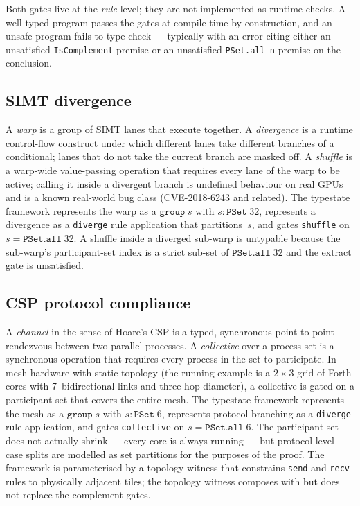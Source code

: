 \documentclass[acmsmall,screen,review,anonymous,nonacm]{acmart}
\newcommand{\PSet}{\texttt{PSet}}
\newcommand{\IsComplement}{\texttt{IsComplement}}
\begin{document}
Both gates live at the \emph{rule} level; they are not implemented as runtime checks. A well-typed program passes the gates at compile time by construction, and an unsafe program fails to type-check --- typically with an error citing either an unsatisfied \IsComplement{} premise or an unsatisfied \texttt{PSet.all n} premise on the conclusion.

\subsection{SIMT divergence}\label{sec:simt-divergence}

A \emph{warp} is a group of SIMT lanes that execute together. A \emph{divergence} is a runtime control-flow construct under which different lanes take different branches of a conditional; lanes that do not take the current branch are masked off. A \emph{shuffle} is a warp-wide value-passing operation that requires every lane of the warp to be active; calling it inside a divergent branch is undefined behaviour on real GPUs and is a known real-world bug class (CVE-2018-6243 and related). The typestate framework represents the warp as a $\texttt{group}\;s$ with $s : \PSet\;32$, represents a divergence as a \texttt{diverge} rule application that partitions~$s$, and gates \texttt{shuffle} on $s = \texttt{PSet.all}\;32$. A shuffle inside a diverged sub-warp is untypable because the sub-warp's participant-set index is a strict sub-set of $\texttt{PSet.all}\;32$ and the extract gate is unsatisfied.

\subsection{CSP protocol compliance}\label{sec:csp-protocol-compliance}

A \emph{channel} in the sense of Hoare's CSP is a typed, synchronous point-to-point rendezvous between two parallel processes. A \emph{collective} over a process set is a synchronous operation that requires every process in the set to participate. In mesh hardware with static topology (the running example is a $2\times3$ grid of Forth cores with 7~bidirectional links and three-hop diameter), a collective is gated on a participant set that covers the entire mesh. The typestate framework represents the mesh as a $\texttt{group}\;s$ with $s : \PSet\;6$, represents protocol branching as a \texttt{diverge} rule application, and gates \texttt{collective} on $s = \texttt{PSet.all}\;6$. The participant set does not actually shrink --- every core is always running --- but protocol-level case splits are modelled as set partitions for the purposes of the proof. The framework is parameterised by a topology witness that constrains \texttt{send} and \texttt{recv} rules to physically adjacent tiles; the topology witness composes with but does not replace the complement gates.
\end{document}
